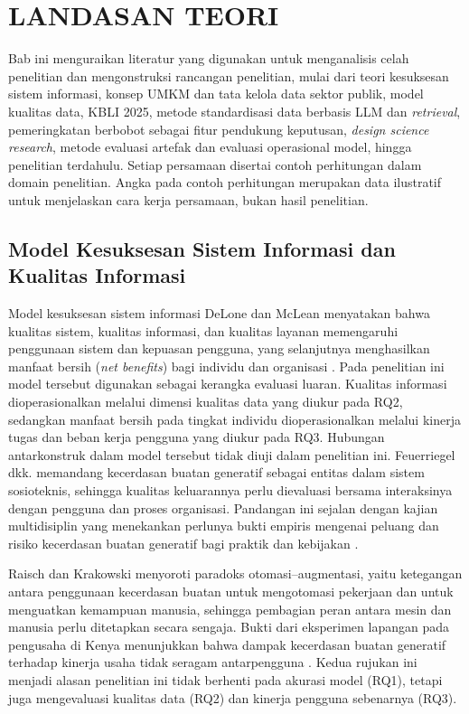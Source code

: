 \chapter{LANDASAN TEORI}
\label{chap:teori}

Bab ini menguraikan literatur yang digunakan untuk menganalisis celah penelitian dan mengonstruksi rancangan penelitian, mulai dari teori kesuksesan sistem informasi, konsep UMKM dan tata kelola data sektor publik, model kualitas data, KBLI 2025, metode standardisasi data berbasis LLM dan \textit{retrieval}, pemeringkatan berbobot sebagai fitur pendukung keputusan, \textit{design science research}, metode evaluasi artefak dan evaluasi operasional model, hingga penelitian terdahulu. Setiap persamaan disertai contoh perhitungan dalam domain penelitian. Angka pada contoh perhitungan merupakan data ilustratif untuk menjelaskan cara kerja persamaan, bukan hasil penelitian.

\section{Model Kesuksesan Sistem Informasi dan Kualitas Informasi}
\label{sec:delone}

Model kesuksesan sistem informasi DeLone dan McLean menyatakan bahwa kualitas sistem, kualitas informasi, dan kualitas layanan memengaruhi penggunaan sistem dan kepuasan pengguna, yang selanjutnya menghasilkan manfaat bersih (\textit{net benefits}) bagi individu dan organisasi \cite{delone2003success}. Pada penelitian ini model tersebut digunakan sebagai kerangka evaluasi luaran. Kualitas informasi dioperasionalkan melalui dimensi kualitas data yang diukur pada RQ2, sedangkan manfaat bersih pada tingkat individu dioperasionalkan melalui kinerja tugas dan beban kerja pengguna yang diukur pada RQ3. Hubungan antarkonstruk dalam model tersebut tidak diuji dalam penelitian ini. Feuerriegel dkk. \cite{feuerriegel2024genai} memandang kecerdasan buatan generatif sebagai entitas dalam sistem sosioteknis, sehingga kualitas keluarannya perlu dievaluasi bersama interaksinya dengan pengguna dan proses organisasi. Pandangan ini sejalan dengan kajian multidisiplin yang menekankan perlunya bukti empiris mengenai peluang dan risiko kecerdasan buatan generatif bagi praktik dan kebijakan \cite{dwivedi2023chatgpt}.

Raisch dan Krakowski \cite{raisch2021automation} menyoroti paradoks otomasi--augmentasi, yaitu ketegangan antara penggunaan kecerdasan buatan untuk mengotomasi pekerjaan dan untuk menguatkan kemampuan manusia, sehingga pembagian peran antara mesin dan manusia perlu ditetapkan secara sengaja. Bukti dari eksperimen lapangan pada pengusaha di Kenya menunjukkan bahwa dampak kecerdasan buatan generatif terhadap kinerja usaha tidak seragam antarpengguna \cite{otis2026uneven}. Kedua rujukan ini menjadi alasan penelitian ini tidak berhenti pada akurasi model (RQ1), tetapi juga mengevaluasi kualitas data (RQ2) dan kinerja pengguna sebenarnya (RQ3).

